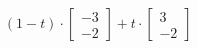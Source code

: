 \documentclass[preview]{standalone}
\begin{document}
\begin{align*}
(1- t ) \cdot \begin{bmatrix} -3 \\ -2 \end{bmatrix} + t \cdot \begin{bmatrix} 3 \\ -2 \end{bmatrix}
\end{align*}
\end{document}
